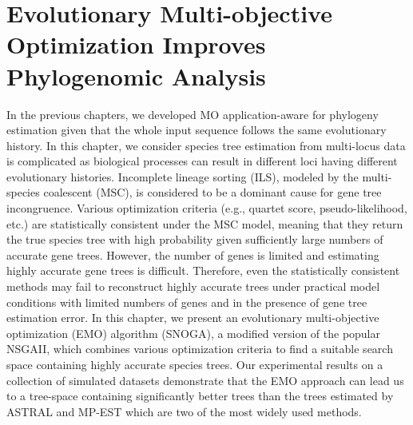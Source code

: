 \graphicspath{{snoga/}}
\chapter{Evolutionary Multi-objective Optimization Improves Phylogenomic Analysis} \label{ch:snoga}

	In the previous chapters, we developed MO application-aware for phylogeny estimation given that the whole input sequence follows the same evolutionary history.
	In this chapter, we consider species tree estimation from multi-locus data is complicated as biological processes can result in different loci having different evolutionary histories. Incomplete lineage sorting (ILS), modeled by the multi-species coalescent (MSC), is considered to be a dominant cause for gene tree incongruence. Various optimization criteria (e.g., quartet score, pseudo-likelihood, etc.) are statistically consistent under the MSC model, meaning that they return the true species tree with high probability given sufficiently large numbers of accurate gene trees. However, the number of genes is limited and estimating highly accurate gene trees is difficult. Therefore, even the statistically consistent methods may fail to reconstruct highly accurate trees under practical model conditions with limited numbers of genes and in the presence of gene tree estimation error. In this chapter, we present an evolutionary multi-objective optimization (EMO) algorithm (SNOGA), a modified version of the popular NSGAII, which combines various optimization criteria to find a suitable search space containing highly accurate species trees. Our experimental results on a collection of simulated datasets demonstrate that the EMO approach can lead us to a tree-space containing significantly better trees than the trees estimated by ASTRAL and MP-EST which are two of the most widely used methods. 

